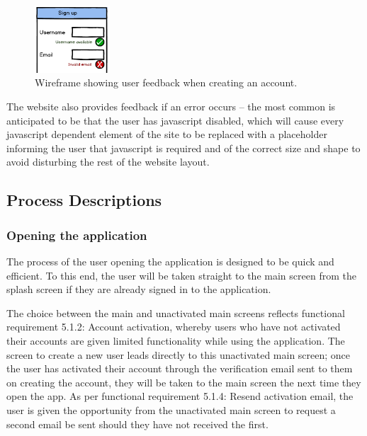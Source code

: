 \begin{figure}
	\vspace{-20pt}
	\begin{center}
	\includegraphics[width=0.25\textwidth]{images/sign_up_wireframe}
	\caption{Wireframe showing user feedback when creating an account.}
	\label{sign_up_wireframe}
	\end{center}
\end{figure}

The website also provides feedback if an error occurs – the most common is anticipated to be that the user has javascript disabled, which will cause every javascript dependent element of the site to be replaced with a placeholder informing the user that javascript is required and of the correct size and shape to avoid disturbing the rest of the website layout.
\vspace{80pt}
\subsection{Process Descriptions}

\subsubsection{Opening the application}
The process of the user opening the application is designed to be quick and efficient. To this end, the user will be taken straight to the main screen from the splash screen if they are already signed in to the application.

The choice between the main and unactivated main screens reflects functional requirement 5.1.2: Account activation, whereby users who have not activated their accounts are given limited functionality while using the application. The screen to create a new user leads directly to this unactivated main screen; once the user has activated their account through the verification email sent to them on creating the account, they will be taken to the main screen the next time they open the app. As per functional requirement 5.1.4: Resend activation email, the user is given the opportunity from the unactivated main screen to request a second email be sent should they have not received the first.

